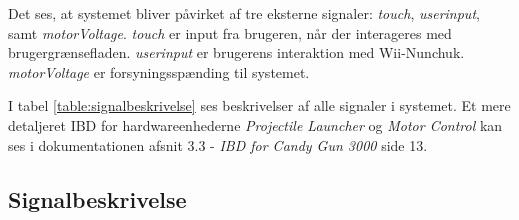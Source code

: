 \noindent Det ses, at systemet bliver påvirket af tre eksterne signaler: \textit{touch}, \textit{userinput}, samt \textit{motorVoltage}. \textit{touch} er input fra brugeren, når der interageres med brugergrænsefladen. \textit{userinput} er brugerens interaktion med Wii-Nunchuk. \textit{motorVoltage} er forsyningsspænding til systemet.\newline

\noindent I tabel \ref{table:signalbeskrivelse} ses beskrivelser af alle signaler i systemet. Et mere detaljeret IBD for hardwareenhederne \textit{Projectile Launcher} og \textit{Motor Control} kan ses i dokumentationen afsnit 3.3 - \textit{IBD for Candy Gun 3000} side 13. 

\newpage
\subsection{Signalbeskrivelse}
